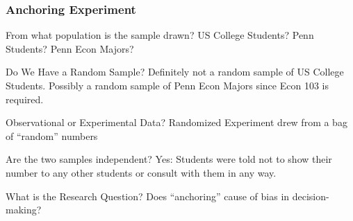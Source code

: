 \documentclass[handout]{beamer}
\begin{document}
\begin{frame}
\frametitle{Anchoring Experiment}
\small
\singlespacing
\begin{block}{From what population is the sample drawn?} 
US College Students? Penn Students? Penn Econ Majors? 
\end{block}

\begin{block}{Do We Have a Random Sample?} 
Definitely not a random sample of US College Students. Possibly a random sample of Penn Econ Majors since Econ 103 is required. 
\end{block}


\begin{block}{Observational or Experimental Data?} 
Randomized Experiment drew from a bag of ``random'' numbers 
\end{block}

\begin{block}{Are the two samples independent?}
Yes: Students were told not to show their number to any other students or consult with them in any way. 
\end{block}

\begin{block}{What is the Research Question?} 
Does ``anchoring'' cause of bias in decision-making? 
\end{block}
\end{frame}
\end{document}
